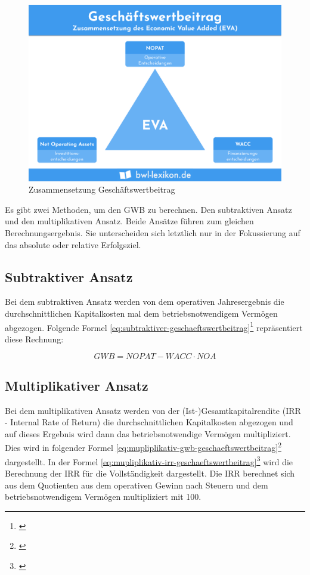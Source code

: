 \begin{figure}[!h]
    \includegraphics[width=\linewidth]{./media/economic-value-added.png}
    \caption{Zusammensetzung Geschäftswertbeitrag}
    \label{fig:zsmgeschaeftswertbeitrag}
\end{figure}

\noindent
Es gibt zwei Methoden, um den GWB zu berechnen. Den subtraktiven Ansatz und den multiplikativen Ansatz. Beide Ansätze führen zum gleichen Berechnungsergebnis. Sie unterscheiden sich letztlich nur in der Fokussierung auf das absolute oder relative Erfolgsziel.

\subsection{Subtraktiver Ansatz}

Bei dem subtraktiven Ansatz werden von dem operativen Jahresergebnis die durchschnittlichen Kapitalkosten mal dem betriebsnotwendigem Vermögen abgezogen. Folgende Formel \eqref{eq:subtraktiver-geschaeftswertbeitrag}\footnote{\cite{wikipedia-eva}} repräsentiert diese Rechnung:

\begin{equation}
    GWB = NOPAT - WACC \cdot NOA
    \label{eq:subtraktiver-geschaeftswertbeitrag}
\end{equation}

\subsection{Multiplikativer Ansatz}

Bei dem multiplikativen Ansatz werden von der (Ist-)Gesamtkapitalrendite (IRR - Internal Rate of Return) die durchschnittlichen Kapitalkosten abgezogen und auf dieses Ergebnis wird dann das betriebsnotwendige Vermögen multipliziert. Dies wird in folgender Formel \eqref{eq:mupliplikativ-gwb-geschaeftswertbeitrag}\footnote{\cite{wikipedia-eva}} dargestellt. In der Formel \eqref{eq:mupliplikativ-irr-geschaeftswertbeitrag}\footnote{\cite{controllingportal-eva}} wird die Berechnung der IRR für die Vollständigkeit dargestellt. Die IRR berechnet sich aus dem Quotienten aus dem operativen Gewinn nach Steuern und dem betriebsnotwendigem Vermögen multipliziert mit 100.


